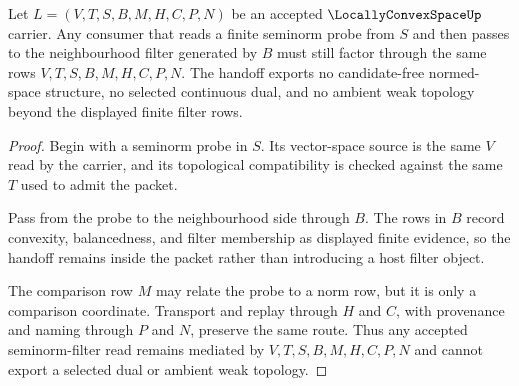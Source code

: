 \begin{theorem}
\label{thm:locally-convex-space-seminorm-filter-stability}
Let $L=(V,T,S,B,M,H,C,P,N)$ be an accepted $\LocallyConvexSpaceUp$ carrier. Any consumer that reads a finite seminorm probe from $S$ and then passes to the neighbourhood filter generated by $B$ must still factor through the same rows $V,T,S,B,M,H,C,P,N$. The handoff exports no candidate-free normed-space structure, no selected continuous dual, and no ambient weak topology beyond the displayed finite filter rows.
\end{theorem}
\begin{proof}
Begin with a seminorm probe in $S$. Its vector-space source is the same $V$ read by the carrier, and its topological compatibility is checked against the same $T$ used to admit the packet.

Pass from the probe to the neighbourhood side through $B$. The rows in $B$ record convexity, balancedness, and filter membership as displayed finite evidence, so the handoff remains inside the packet rather than introducing a host filter object.

The comparison row $M$ may relate the probe to a norm row, but it is only a comparison coordinate. Transport and replay through $H$ and $C$, with provenance and naming through $P$ and $N$, preserve the same route. Thus any accepted seminorm-filter read remains mediated by $V,T,S,B,M,H,C,P,N$ and cannot export a selected dual or ambient weak topology.
\end{proof}

